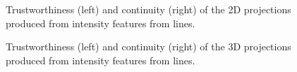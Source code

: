 \clearpage
\begin{figure}[H]
	\centering
	\caption{Trustworthiness (left) and continuity (right) of the 2D projections produced from intensity features from lines.}\label{fig:TC_2d_intensity}
\end{figure}

\begin{figure}[H]
	\centering
	\caption{Trustworthiness (left) and continuity (right) of the 3D projections produced from intensity features from lines.}\label{fig:TC_3d_intensity}
\end{figure}

